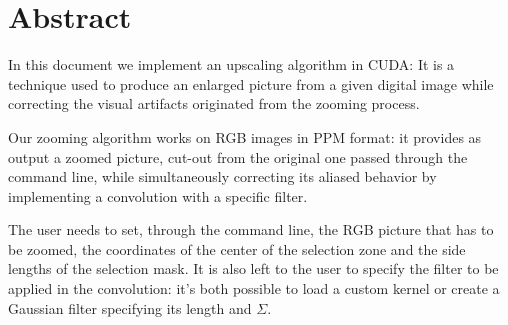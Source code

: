 \section*{Abstract}

In this document we implement an upscaling algorithm in CUDA: It is a technique used to produce an enlarged picture from a given digital image while correcting the visual artifacts originated from the zooming process.

Our zooming algorithm works on RGB images in PPM format:
it provides as output a zoomed picture, cut-out from the original one passed through the command line, while simultaneously correcting its aliased behavior by implementing a convolution with a specific filter.

The user needs to set, through the command line, the RGB picture that has to be zoomed, the coordinates of the center of the selection zone and the side lengths of the selection mask.
It is also left to the user to specify the filter to be applied in the convolution: it's both possible to load a custom kernel or create a Gaussian filter specifying its length and $\Sigma$.

